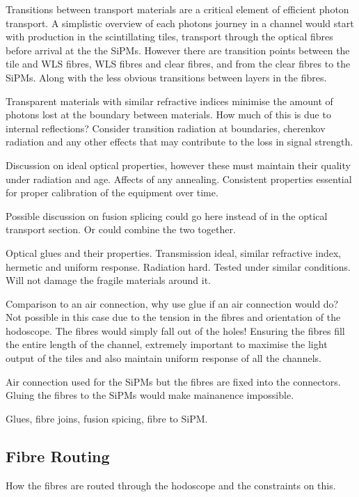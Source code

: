 Transitions between transport materials are a critical element of efficient photon transport. A simplistic overview of each photons journey in a channel would start with production in the scintillating tiles, transport through the optical fibres before arrival at the the SiPMs. However there are transition points between the tile and WLS fibres, WLS fibres and clear fibres, and from the clear fibres to the SiPMs. Along with the less obvious transitions between layers in the fibres.  

Transparent materials with similar refractive indices minimise the amount of photons lost at the boundary between materials. How much of this is due to internal reflections? Consider transition radiation at boundaries, cherenkov radiation and any other effects that may contribute to the loss in signal strength.

Discussion on ideal optical properties, however these must maintain their quality under radiation and age. Affects of any annealing. Consistent properties essential for proper calibration of the equipment over time.

Possible discussion on fusion splicing could go here instead of in the optical transport section. Or could combine the two together.

Optical glues and their properties. Transmission ideal, similar refractive index, hermetic and uniform response. Radiation hard. Tested under similar conditions. Will not damage the fragile materials around it.

Comparison to an air connection, why use glue if an air connection would do? Not possible in this case due to the tension in the fibres and orientation of the hodoscope. The fibres would simply fall out of the holes! Ensuring the fibres fill the entire length of the channel, extremely important to maximise the light output of the tiles and also maintain uniform response of all the channels.

Air connection used for the SiPMs but the fibres are fixed into the connectors. Gluing the fibres to the SiPMs would make mainanence impossible. 

Glues, fibre joins, fusion spicing, fibre to SiPM.

\subsection{Fibre Routing}

How the fibres are routed through the hodoscope and the constraints on this.

